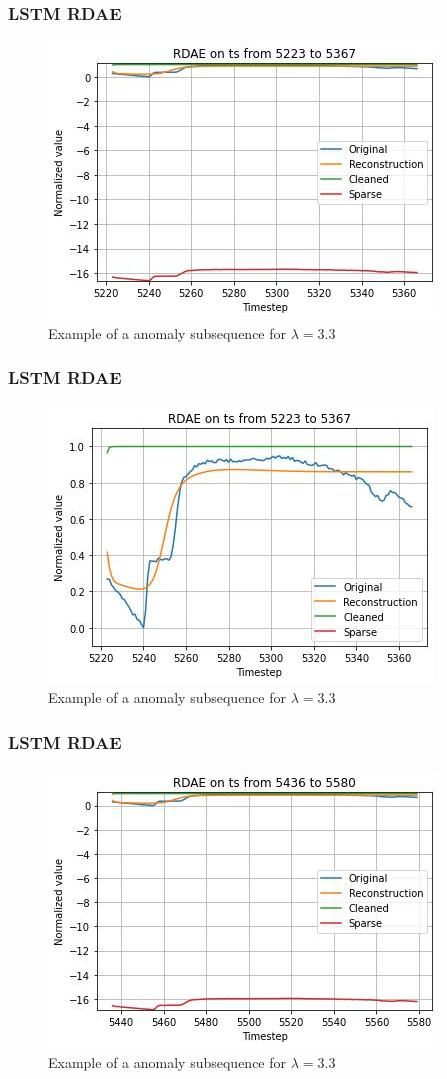 \documentclass{beamer}
\theoremstyle{plain}
\theoremstyle{definition}
\theoremstyle{remark}
\begin{document}
\begin{frame}
	\frametitle{LSTM RDAE}
	\begin{figure}
		\centering
		\includegraphics[width=0.7\linewidth]{Images/LSTMlam3.3ts_anomaly5223.jpg}
		\caption[]{Example of a anomaly subsequence for $\lambda=3.3$}
	\end{figure}
\end{frame}

\begin{frame}
	\frametitle{LSTM RDAE}
	\begin{figure}
		\centering
		\includegraphics[width=0.7\linewidth]{Images/LSTMlam3.3ts_anomalyzoom5223.jpg}
		\caption[]{Example of a anomaly subsequence for $\lambda=3.3$}
	\end{figure}
\end{frame}

\begin{frame}
	\frametitle{LSTM RDAE}
	\begin{figure}
		\centering
		\includegraphics[width=0.7\linewidth]{Images/LSTMlam3.3ts_anomaly5436.jpg}
		\caption[]{Example of a anomaly subsequence for $\lambda=3.3$}
	\end{figure}
\end{frame}
\end{document}
